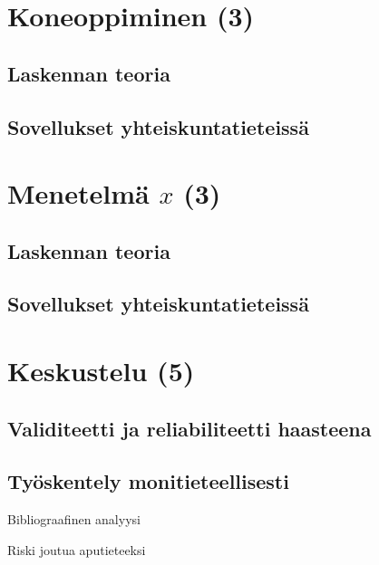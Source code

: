 \documentclass[finnish,gradu,twoside,12pt]{tktltiki}
\begin{document}
{\section{Koneoppiminen (3)}

\subsection{Laskennan teoria}

\subsection{Sovellukset yhteiskuntatieteissä}

\cite{collingwood12}

\newpage

\section{Menetelmä $x$ (3)}

\subsection{Laskennan teoria}

\subsection{Sovellukset yhteiskuntatieteissä}

\newpage

\section{Keskustelu (5)}

\subsection{Validiteetti ja reliabiliteetti haasteena}

\subsection{Työskentely monitieteellisesti}

Bibliograafinen analyysi

Riski joutua aputieteeksi

\begin{figure}


\end{figure}}
\end{document}
